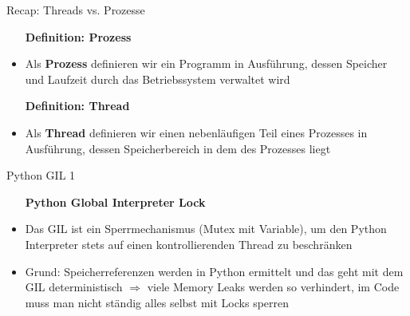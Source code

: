 \begin{frame}{Recap: Threads vs. Prozesse}
    
     \begin{itemize}
        \setlength{\itemindent}{1.2in}
        \item [\textbf{Definition: Prozess}]
    \end{itemize}

    \begin{itemize}
        \item Als \textbf{Prozess} definieren wir ein Programm in Ausführung, dessen Speicher und Laufzeit durch das Betriebssystem verwaltet wird
     \end{itemize}
    
  	   \vspace*{10mm}
    
    
         \begin{itemize}
        \setlength{\itemindent}{1.2in}
        \item [\textbf{Definition: Thread}]
    \end{itemize}

    \begin{itemize}
        \item Als \textbf{Thread} definieren wir einen nebenläufigen Teil eines Prozesses in Ausführung, dessen Speicherbereich in dem des Prozesses liegt
     \end{itemize}
    
    \end{frame}



\begin{frame}{Python GIL 1}
                 \begin{itemize}
        \setlength{\itemindent}{1.9in}
        \item [\textbf{Python Global Interpreter Lock }]
    \end{itemize}
    \begin{itemize}
        \item Das GIL ist ein Sperrmechanismus (Mutex mit Variable), um den Python Interpreter stets auf einen kontrollierenden Thread zu beschränken  \cite{realpython.com/python-gil}
        \item Grund: Speicherreferenzen werden in Python ermittelt und das geht mit dem GIL deterministisch $\Rightarrow$ viele Memory Leaks werden so verhindert, im Code muss man nicht ständig alles selbst mit Locks sperren
    \end{itemize}
    
    \end{frame}
    
